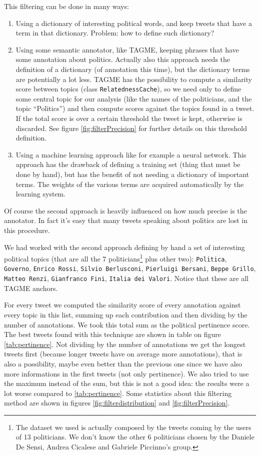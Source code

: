\documentclass[a4paper,11pt,oneside]{article}
\begin{document}
This filtering can be done in many ways:
\begin{enumerate}
\item Using a dictionary of interesting political words, and keep tweets that have a term in that dictionary. Problem:  how to define such dictionary?
\item Using some semantic annotator, like TAGME, keeping phrases that have some annotation about politics. Actually also this approach needs the definition of a dictionary (of annotation this time), but the dictionary terms are potentially a lot less. TAGME has the possibility to compute a similarity score between topics (class \texttt{RelatednessCache}), so we need only to define some central topic for our analysis (like the names of the politicians, and the topic ``Politics'') and then compute scores against the topics found in a tweet. If the total score is over a certain threshold the tweet is kept, otherwise is discarded. See figure \ref{fig:filterPrecision} for further details on this threshold definition.
\item Using a machine learning approach like for example a neural network. This approach has the drawback of defining a training set (thing that must be done by hand), but has the benefit of not needing a dictionary of important terms. The weights of the various terms are acquired automatically by the learning system.
\end{enumerate}

Of course the second approach is heavily influenced on how much precise is the annotator. In fact it's easy that many tweets speaking about politics are lost in this procedure.

We had worked with the second approach defining by hand a set of interesting political topics (that are all the 7 politicians\footnote{The dataset we used is actually composed by the tweets coming by the users of 13 politicians. We don't know the other 6 politicians chosen by the Daniele De Sensi, Andrea Cicalese and Gabriele Piccinno's group.} plus other two): \texttt{Politica}, \texttt{Governo}, \texttt{Enrico Rossi}, \texttt{Silvio Berlusconi}, \texttt{Pierluigi Bersani}, \texttt{Beppe Grillo}, \texttt{Matteo Renzi}, \texttt{Gianfranco Fini}, \texttt{Italia dei Valori}. Notice that these are all TAGME anchors.

For every tweet we computed the similarity score of every annotation against every topic in this list, summing up each contribution and then dividing by the number of annotations. We took this total sum as the political pertinence score. The best tweets found with this technique are shown in table on figure \ref{tab:pertinence}.
Not dividing by the number of annotations we get the longest tweets first (because longer tweets have on average more annotations), that is also a possibility, maybe even better than the previous one since we have also more informations in the first tweets (not only pertinence). We also tried to use the maximum instead of the sum, but this is not a good idea: the results were a lot worse compared to \ref{tab:pertinence}. Some statistics about this filtering method are shown in figures \ref{fig:filterdistribution} and \ref{fig:filterPrecision}.
\end{document}
